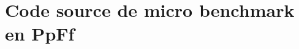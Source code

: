 
\chapter{Code source de micro benchmark en PpFf}
\label{sourceCodeMicrobenchmarkPpFf.ann}



\newpage
